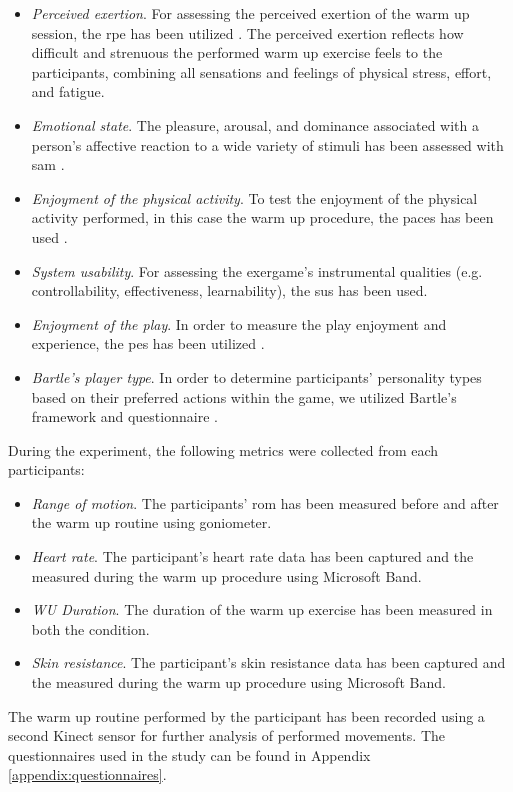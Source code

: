 \begin{itemize}
\item \textit{Perceived exertion}. For assessing the perceived exertion of the warm up session, the \gls{rpe} has been utilized \cite{borg1998borg}. The perceived exertion reflects how difficult and strenuous the performed warm up exercise feels to the participants, combining all sensations and feelings of physical stress, effort, and fatigue.
\item \textit{Emotional state}. The pleasure, arousal, and dominance associated with a person's affective reaction to a wide variety of stimuli has been assessed with \gls{sam} \cite{bradley1994measuring}. 
\item \textit{Enjoyment of the physical activity}. To test the enjoyment of the physical activity performed, in this case the warm up procedure, the \gls{paces} has been used \cite{kendzierski1991physical}. 
\item \textit{System usability}. For assessing the exergame's instrumental qualities (e.g. controllability, effectiveness, learnability), the \gls{sus} has been used.
\item \textit{Enjoyment of the play}. In order to measure the play enjoyment and experience, the \gls{pes} has been utilized  \cite{pavlas2012play}.
\item \textit{Bartle's player type}. In order to determine participants’ personality types based on their preferred actions within the game, we utilized Bartle's framework and questionnaire \cite{bartle}.
\end{itemize}
During the experiment, the following metrics were collected from each participants:
\begin{itemize}
\item \textit{Range of motion}. The participants' \acrshort{rom} has been measured before and after the warm up routine using goniometer.
\item \textit{Heart rate}. The participant's heart rate data has been captured and the measured during the warm up procedure using Microsoft Band.
\item \textit{WU Duration}.  The duration of the warm up exercise has been measured in both the condition.
\item \textit{Skin resistance}. The participant's skin resistance data has been captured and the measured during the warm up procedure using Microsoft Band.
\end{itemize}
The warm up routine performed by the participant has been recorded using a second Kinect sensor for further analysis of performed movements. The questionnaires used in the study can be found in Appendix \ref{appendix:questionnaires}.\pagebreak
